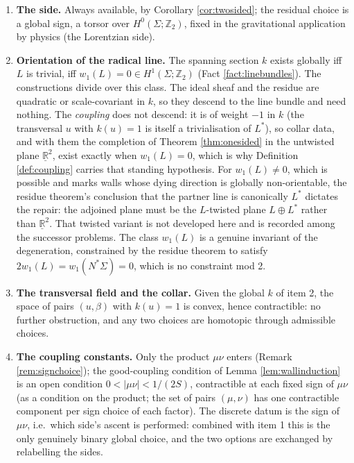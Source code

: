 \documentclass[11pt]{article}
\theoremstyle{definition}
\newcommand{\R}{\mathbb{R}}
\newcommand{\shL}{L}
\newcommand{\Sig}{\Sigma}
\begin{document}
\begin{enumerate}
\item \textbf{The side.} Always available, by Corollary \ref{cor:twosided}; the residual choice is a global sign, a torsor over $H^0(\Sig; \mathbb{Z}_2)$, fixed in the gravitational application by physics (the Lorentzian side).
\item \textbf{Orientation of the radical line.} The spanning section $k$ exists globally iff $\shL$ is trivial, iff $w_1(\shL) = 0 \in H^1(\Sig; \mathbb{Z}_2)$ (Fact \ref{fact:linebundles}). The constructions divide over this class. The ideal sheaf and the residue are quadratic or scale-covariant in $k$, so they descend to the line bundle and need nothing. The \emph{coupling} does not descend: it is of weight $-1$ in $k$ (the transversal $u$ with $k(u) = 1$ is itself a trivialisation of $\shL^*$), so collar data, and with them the completion of Theorem \ref{thm:onesided} in the untwisted plane $\underline{\R}^2$, exist exactly when $w_1(\shL) = 0$, which is why Definition \ref{def:coupling} carries that standing hypothesis. For $w_1(\shL) \neq 0$, which is possible and marks walls whose dying direction is globally non-orientable, the residue theorem's conclusion that the partner line is canonically $\shL^*$ dictates the repair: the adjoined plane must be the $\shL$-twisted plane $\shL \oplus \shL^*$ rather than $\underline{\R}^2$. That twisted variant is not developed here and is recorded among the successor problems. The class $w_1(\shL)$ is a genuine invariant of the degeneration, constrained by the residue theorem to satisfy $2 w_1(\shL) = w_1(N^*\Sig) = 0$, which is no constraint mod 2.
\item \textbf{The transversal field and the collar.} Given the global $k$ of item 2, the space of pairs $(u, \beta)$ with $k(u) = 1$ is convex, hence contractible: no further obstruction, and any two choices are homotopic through admissible choices.
\item \textbf{The coupling constants.} Only the product $\mu\nu$ enters (Remark \ref{rem:signchoice}); the good-coupling condition of Lemma \ref{lem:wallinduction} is an open condition $0 < |\mu\nu| < 1/(2S)$, contractible at each fixed sign of $\mu\nu$ (as a condition on the product; the set of pairs $(\mu,\nu)$ has one contractible component per sign choice of each factor). The discrete datum is the sign of $\mu\nu$, i.e.\ which side's ascent is performed: combined with item 1 this is the only genuinely binary global choice, and the two options are exchanged by relabelling the sides.
\end{enumerate}
\end{document}
